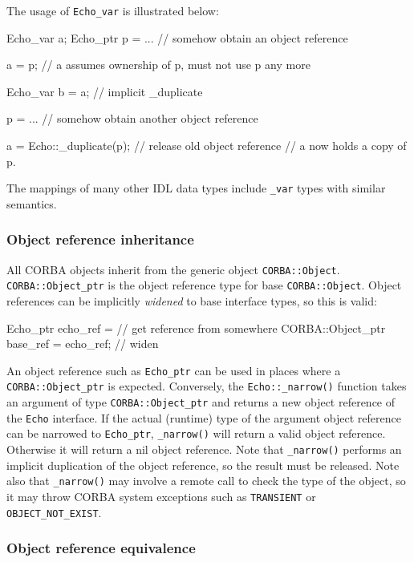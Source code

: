 \documentclass[11pt,oneside,a4paper]{book}
\newcommand{\type}[1]{\texttt{#1}}
\newcommand{\intf}[1]{\texttt{#1}}
\newcommand{\code}[1]{\texttt{#1}}
\newcommand{\op}[1]{\texttt{#1()}}
\newcommand{\dsc}{\discretionary{}{}{}}
\begin{document}
The usage of \type{Echo\_var} is illustrated below:

\begin{cxxlisting}
Echo_var a;
Echo_ptr p = ... // somehow obtain an object reference

a = p;           // a assumes ownership of p, must not use p any more

Echo_var b = a;  // implicit _duplicate

p = ...          // somehow obtain another object reference

a = Echo::_duplicate(p);     // release old object reference
                             // a now holds a copy of p.
\end{cxxlisting}

The mappings of many other IDL data types include \type{\_var} types
with similar semantics.


\subsubsection{Object reference inheritance}

All CORBA objects inherit from the generic object
\type{CORBA::Object}.  \type{CORBA::\dsc{}Object\_ptr} is the object
reference type for base \type{CORBA::Object}. Object references can be
implicitly \emph{widened} to base interface types, so this is valid:

\begin{cxxlisting}
Echo_ptr echo_ref = // get reference from somewhere
CORBA::Object_ptr base_ref = echo_ref; // widen
\end{cxxlisting}

An object reference such as \type{Echo\_ptr} can be used in places
where a \type{CORBA::\dsc{}Object\_ptr} is expected. Conversely, the
\op{Echo::\_narrow} function takes an argument of type
\type{CORBA::Object\_ptr} and returns a new object reference of the
\intf{Echo} interface.  If the actual (runtime) type of the argument
object reference can be narrowed to \type{Echo\_ptr}, \op{\_narrow}
will return a valid object reference. Otherwise it will return a nil
object reference. Note that \op{\_narrow} performs an implicit
duplication of the object reference, so the result must be released.
Note also that \op{\_narrow} may involve a remote call to check the
type of the object, so it may throw CORBA system exceptions such as
\code{TRANSIENT} or \code{OBJECT\_NOT\_EXIST}.


\subsubsection{Object reference equivalence}
\end{document}
